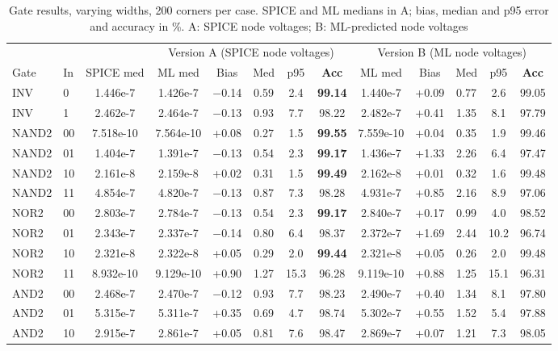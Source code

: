 ﻿\documentclass[conference,10pt]{IEEEtran}
\begin{document}
\begin{table}[!t]
\caption{Gate results, varying widths, 200 corners per case. SPICE and ML medians in A; bias, median and p95 error and accuracy in \%. A: SPICE node voltages; B: ML-predicted node voltages}
\label{tab:gates}
\centering
\footnotesize
\begin{tabular}{@{}ll c ccccc ccccc@{}}
\toprule
 & & & \multicolumn{5}{c}{Version A (SPICE node voltages)} & \multicolumn{5}{c}{Version B (ML node voltages)}\\
\cmidrule(lr){4-8}\cmidrule(lr){9-13}
Gate & In & SPICE med & ML med & Bias & Med & p95 & \textbf{Acc} & ML med & Bias & Med & p95 & \textbf{Acc}\\
\midrule
INV & 0 & 1.446e-7 & 1.426e-7 & $-$0.14 & 0.59 & 2.4 & \textbf{99.14} & 1.440e-7 & +0.09 & 0.77 & 2.6 & 99.05\\
INV & 1 & 2.462e-7 & 2.464e-7 & $-$0.13 & 0.93 & 7.7 & 98.22 & 2.482e-7 & +0.41 & 1.35 & 8.1 & 97.79\\
NAND2 & 00 & 7.518e-10 & 7.564e-10 & +0.08 & 0.27 & 1.5 & \textbf{99.55} & 7.559e-10 & +0.04 & 0.35 & 1.9 & 99.46\\
NAND2 & 01 & 1.404e-7 & 1.391e-7 & $-$0.13 & 0.54 & 2.3 & \textbf{99.17} & 1.436e-7 & +1.33 & 2.26 & 6.4 & 97.47\\
NAND2 & 10 & 2.161e-8 & 2.159e-8 & +0.02 & 0.31 & 1.5 & \textbf{99.49} & 2.162e-8 & +0.01 & 0.32 & 1.6 & 99.48\\
NAND2 & 11 & 4.854e-7 & 4.820e-7 & $-$0.13 & 0.87 & 7.3 & 98.28 & 4.931e-7 & +0.85 & 2.16 & 8.9 & 97.06\\
NOR2 & 00 & 2.803e-7 & 2.784e-7 & $-$0.13 & 0.54 & 2.3 & \textbf{99.17} & 2.840e-7 & +0.17 & 0.99 & 4.0 & 98.52\\
NOR2 & 01 & 2.343e-7 & 2.337e-7 & $-$0.14 & 0.80 & 6.4 & 98.37 & 2.372e-7 & +1.69 & 2.44 & 10.2 & 96.74\\
NOR2 & 10 & 2.321e-8 & 2.322e-8 & +0.05 & 0.29 & 2.0 & \textbf{99.44} & 2.321e-8 & +0.05 & 0.26 & 2.0 & 99.48\\
NOR2 & 11 & 8.932e-10 & 9.129e-10 & +0.90 & 1.27 & 15.3 & 96.28 & 9.119e-10 & +0.88 & 1.25 & 15.1 & 96.31\\
AND2 & 00 & 2.468e-7 & 2.470e-7 & $-$0.12 & 0.93 & 7.7 & 98.23 & 2.490e-7 & +0.40 & 1.34 & 8.1 & 97.80\\
AND2 & 01 & 5.315e-7 & 5.311e-7 & +0.35 & 0.69 & 4.7 & 98.74 & 5.302e-7 & +0.55 & 1.52 & 5.4 & 97.88\\
AND2 & 10 & 2.915e-7 & 2.861e-7 & +0.05 & 0.81 & 7.6 & 98.47 & 2.869e-7 & +0.07 & 1.21 & 7.3 & 98.05\\

\end{tabular}
\end{table}
\end{document}
